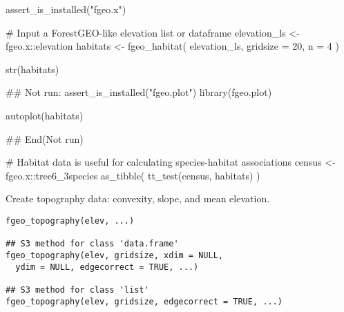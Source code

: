 \documentclass[a4paper]{book}
\begin{document}
%
\begin{Examples}
\begin{ExampleCode}
assert_is_installed("fgeo.x")

# Input a ForestGEO-like elevation list or dataframe
elevation_ls <- fgeo.x::elevation
habitats <- fgeo_habitat(
  elevation_ls,
  gridsize = 20, n = 4
)

str(habitats)

## Not run: 
assert_is_installed("fgeo.plot")
library(fgeo.plot)

autoplot(habitats)

## End(Not run)

# Habitat data is useful for calculating species-habitat associations
census <- fgeo.x::tree6_3species
as_tibble(
  tt_test(census, habitats)
)
\end{ExampleCode}
\end{Examples}
%
\begin{Description}\relax
Create topography data: convexity, slope, and mean elevation.
\end{Description}
%
\begin{Usage}
\begin{verbatim}
fgeo_topography(elev, ...)

## S3 method for class 'data.frame'
fgeo_topography(elev, gridsize, xdim = NULL,
  ydim = NULL, edgecorrect = TRUE, ...)

## S3 method for class 'list'
fgeo_topography(elev, gridsize, edgecorrect = TRUE, ...)
\end{verbatim}
\end{Usage}
%
\end{document}
